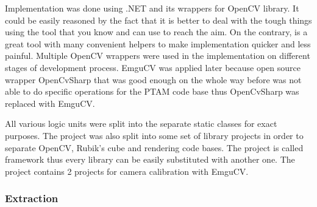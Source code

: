 \documentclass[../../main.tex]{subfiles}
\begin{document}
Implementation was done using .NET {\Csharp} and its wrappers for \ac{OpenCV} library. It could be easily reasoned by the fact that it is better to deal with the tough things using the tool that you know and can use to reach the aim. On the contrary, {\Csharp} is a great tool with many convenient helpers to make implementation quicker and less painful.
Multiple \ac{OpenCV} wrappers were used in the implementation on different stages of development process. \ac{EmguCV} was applied later because open source wrapper OpenCvSharp that was good enough on the whole way before was not able to do specific operations for the \ac{PTAM} code base thus OpenCvSharp was replaced with \ac{EmguCV}.

All various logic units were split into the separate static classes for exact purposes. The project was also split into some set of library projects in order to separate \ac{OpenCV}, Rubik's cube and rendering code bases. The project is called framework thus every library can be easily substituted with another one. The project contains 2 projects for camera calibration with \ac{EmguCV}.

\subsubsection*{Extraction}
\end{document}

